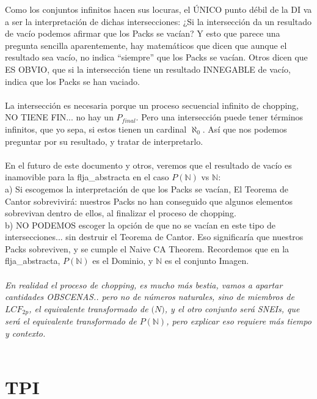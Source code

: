 	\noindent
	Como los conjuntos infinitos hacen sus locuras, el ÚNICO punto débil de la DI va a ser la interpretación de dichas intersecciones: ¿Si la intersección da un resultado de vacío podemos afirmar que los Packs se vacían? Y esto que parece una pregunta sencilla aparentemente, hay matemáticos que dicen que aunque el resultado sea vacío, no indica ``siempre'' que los Packs se vacían. Otros dicen que ES OBVIO, que si la intersección tiene un resultado INNEGABLE de vacío, indica que los Packs se han vaciado.
	\\\\
	
	\noindent
	La intersección es necesaria porque un proceso secuencial infinito de chopping, NO TIENE FIN... no hay un $P_{final}$. Pero una intersección puede tener términos infinitos, que yo sepa, si estos tienen un cardinal $\aleph_{0}$. Así que nos podemos preguntar por su resultado, y tratar de interpretarlo.
	\\\\
	
	\noindent
	En el futuro de este documento y otros, veremos que el resultado de vacío es inamovible para la flja\_abstracta en el caso $P(\mathbb{N})$ vs $\mathbb{N}$:\\
	a) Si escogemos la interpretación de que los Packs se vacían, El Teorema de Cantor sobrevivirá: nuestros Packs no han conseguido que algunos elementos sobrevivan dentro de ellos, al finalizar el proceso de chopping.\\
	b) NO PODEMOS escoger la opción de que no se vacían en este tipo de intersecciones... sin destruir el Teorema de Cantor. Eso significaría que nuestros Packs sobreviven, y se cumple el Naive CA Theorem. Recordemos que en la flja\_abstracta, $P(\mathbb{N})$ es el Dominio, y $\mathbb{N}$ es el conjunto Imagen.
	\\\\
	
	\noindent
	\textit{En realidad el proceso de chopping, es mucho más bestia, vamos a apartar cantidades OBSCENAS.. pero no de números naturales, sino de miembros de $LCF_{2p}$, el equivalente transformado de $\mathbb(N)$, y el otro conjunto será SNEIs, que será el equivalente transformado de $P(\mathbb{N})$, pero explicar eso requiere más tiempo y contexto.}
	\\\\
	
	\newpage
	
	\section{TPI}
	
